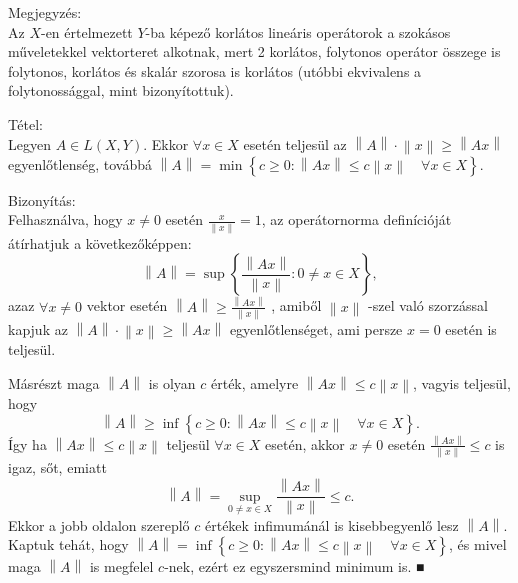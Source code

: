\documentclass[12pt,a4paper]{scrartcl}
\newenvironment{tetel}{}{}
\newenvironment{bizonyitas}{}{}
\newenvironment{megjegyzes}{}{}
\begin{document}
\begin{megjegyzes}

Megjegyzés:\\
Az \(X\)-en értelmezett \(Y\)-ba képező korlátos lineáris operátorok a
szokásos műveletekkel vektorteret alkotnak, mert 2 korlátos, folytonos
operátor összege is folytonos, korlátos és skalár szorosa is korlátos
(utóbbi ekvivalens a folytonossággal, mint bizonyítottuk).

\end{megjegyzes}

\begin{tetel}

Tétel:\\
Legyen \(A \in L\left( {X,Y} \right)\). Ekkor \(\forall x \in X\) esetén
teljesül az
\(\left\| A \right\| \cdot \left\| x \right\| \geq \left\| {Ax} \right\|\)
egyenlőtlenség, továbbá
\(\left\| A \right\| = \min\left\{ {c \geq 0:\left\| {Ax} \right\| \leq c\left\| x \right\|\quad\forall x \in X} \right\}\).

\end{tetel}

\begin{bizonyitas}

Bizonyítás:\\
Felhasználva, hogy \(x \neq 0\) esetén
\(\frac{x}{\left\| x \right\|} = 1\), az operátornorma definícióját
átírhatjuk a következőképpen:
\[\left\| A \right\| = \sup\left\{ {\frac{\left\| {Ax} \right\|}{\left\| x \right\|}:0 \neq x \in X} \right\},\]
azaz \(\forall x \neq 0\) vektor esetén
\(\left\| A \right\| \geq \frac{\left\| {Ax} \right\|}{\left\| x \right\|}\)
, amiből \(\left\| x \right\|\) -szel való szorzással kapjuk az
\(\left\| A \right\| \cdot \left\| x \right\| \geq \left\| {Ax} \right\|\)
egyenlőtlenséget, ami persze \(x = 0\) esetén is teljesül.

Másrészt maga \(\left\| A \right\|\) is olyan \(c\) érték, amelyre
\(\left\| {Ax} \right\| \leq c\left\| x \right\|\), vagyis teljesül,
hogy
\[\left\| A \right\| \geq \inf\left\{ {c \geq 0:\left\| {Ax} \right\| \leq c\left\| x \right\|\quad\forall x \in X} \right\}.\]
Így ha \(\left\| {Ax} \right\| \leq c\left\| x \right\|\) teljesül
\(\forall x \in X\) esetén, akkor \(x \neq 0\) esetén
\(\frac{\left\| {Ax} \right\|}{\left\| x \right\|} \leq c\) is igaz,
sőt, emiatt
\[\left\| A \right\| = \sup\limits_{0 \neq x \in X}\frac{\left\| {Ax} \right\|}{\left\| x \right\|} \leq c.\]
Ekkor a jobb oldalon szereplő \(c\) értékek infimumánál is kisebbegyenlő
lesz \(\left\| A \right\|\). Kaptuk tehát, hogy
\(\left\| A \right\| = \inf\left\{ {c \geq 0:\left\| {Ax} \right\| \leq c\left\| x \right\|\quad\forall x \in X} \right\}\),
és mivel maga \(\left\| A \right\|\) is megfelel \(c\)-nek, ezért ez
egyszersmind minimum is. ■

\end{bizonyitas}
\end{document}

